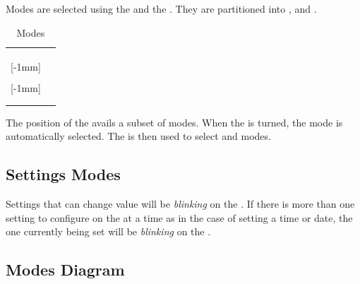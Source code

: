 Modes are selected using the  and the .  They are partitioned
into ,  and .

\begin{table}[H]
\centering
\begin{tabu} { X[1,c,m] | X[1,c,m] }
  \thrule

  & \hyperref[Clock]{} \\
  \hyperref[Primary Modes]{} & \hyperref[Set Alarm]{} \\
  & \hyperref[Timer]{} \\ 

  [-1mm]{\hyperref[Secondary Modes]{}}
    & \hyperref[Set Clock]{} \\
  & \hyperref[Power Settings]{} \\ 

  [-1mm]{\hyperref[Tertiary Modes]{}}
    & \hyperref[Touch Settings]{} \\
  & \hyperref[Set Night Light]{} \\
  \bhrule
\end{tabu}
\caption {Modes}
\end{table}

The position of the  avails a subset of modes.  When the  is
turned, the  mode is automatically selected.  The  is then used
to select  and  modes.

\subsection{Settings Modes}

Settings that can change value will be \textit{blinking} on the . If
there is more than one setting to configure on the  at a time as in the
case of setting a time or date, the one currently being set will be
\textit{blinking} on the .

\subsection{Modes Diagram}

